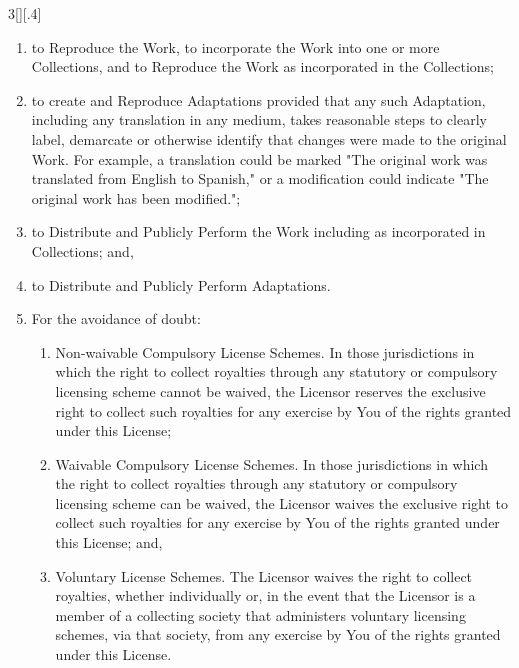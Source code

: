 \documentclass[8pt,a4paper]{article}
\begin{document}
\begin{multicols}{3}[][.4\paperwidth]
\begin{enumerate}
\begin{enumerate}
  \item to Reproduce the Work, to incorporate the Work into one or more
        Collections, and to Reproduce the Work as incorporated in the
        Collections;
  \item to create and Reproduce Adaptations provided that any such Adaptation,
        including any translation in any medium, takes reasonable steps to
        clearly label, demarcate or otherwise identify that changes were made
        to the original Work. For example, a translation could be marked "The
        original work was translated from English to Spanish," or a
        modification could indicate "The original work has been modified.";
  \item to Distribute and Publicly Perform the Work including as incorporated
        in Collections; and,
  \item to Distribute and Publicly Perform Adaptations.
  \item For the avoidance of doubt:

     \begin{enumerate}

     \item Non-waivable Compulsory License Schemes. In those jurisdictions in
           which the right to collect royalties through any statutory or
           compulsory licensing scheme cannot be waived, the Licensor
           reserves the exclusive right to collect such royalties for any
           exercise by You of the rights granted under this License;
    \item Waivable Compulsory License Schemes. In those jurisdictions in
           which the right to collect royalties through any statutory or
           compulsory licensing scheme can be waived, the Licensor waives the
           exclusive right to collect such royalties for any exercise by You
           of the rights granted under this License; and,
    \item Voluntary License Schemes. The Licensor waives the right to
           collect royalties, whether individually or, in the event that the
           Licensor is a member of a collecting society that administers
           voluntary licensing schemes, via that society, from any exercise
           by You of the rights granted under this License.

    \end{enumerate}

  \end{enumerate}


\end{enumerate}
\end{multicols}
\end{document}
